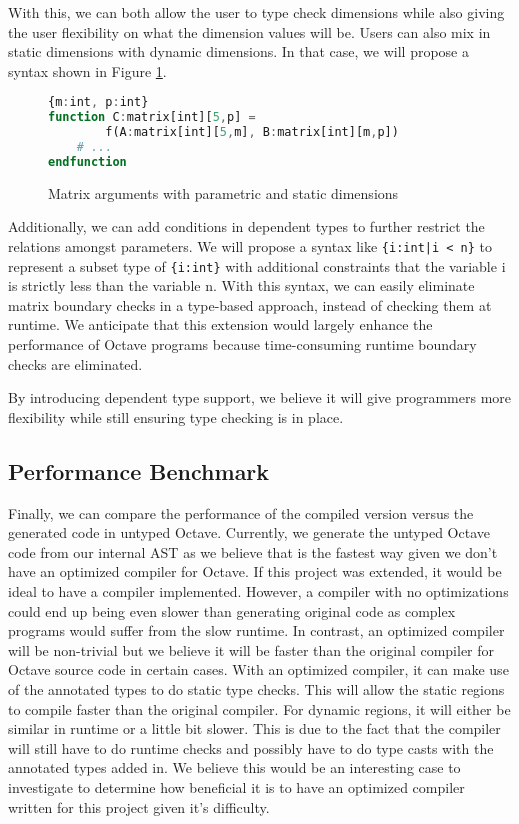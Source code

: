 With this, we can both allow the user to type check dimensions while also giving the user flexibility on what the dimension values will be. Users can also mix in static dimensions with dynamic dimensions. In that case, we will propose a syntax shown in Figure \ref{fig:variableAndStaticDimensions}.

\begin{figure}[h]
    \begin{lstlisting}[language=octave]
{m:int, p:int}
function C:matrix[int][5,p] = 
        f(A:matrix[int][5,m], B:matrix[int][m,p])
    # ...
endfunction
    \end{lstlisting}
    \caption[]{{Matrix arguments with parametric and static dimensions}}
    \label{fig:variableAndStaticDimensions}
\end{figure}

Additionally, we can add conditions in dependent types to further restrict the relations amongst parameters. We will propose a syntax like {\tt \{i:int|i < n\}} to represent a subset type of {\tt \{i:int\}} with additional constraints that the variable i is strictly less than the variable n. With this syntax, we can easily eliminate matrix boundary checks in a type-based approach, instead of checking them at runtime. We anticipate that this extension would largely enhance the performance of Octave programs because time-consuming runtime boundary checks are eliminated.

By introducing dependent type support, we believe it will give programmers more flexibility while still ensuring type checking is in place. 

\subsection{Performance Benchmark}
Finally, we can compare the performance of the compiled version versus the generated code in untyped Octave. Currently, we generate the untyped Octave code from our internal AST as we believe that is the fastest way given we don't have an optimized compiler for Octave. If this project was extended, it would be ideal to have a compiler implemented. However, a compiler with no optimizations could end up being even slower than generating original code as complex programs would suffer from the slow runtime. In contrast, an optimized compiler will be non-trivial but we believe it will be faster than the original compiler for Octave source code in certain cases. With an optimized compiler, it can make use of the annotated types to do static type checks. This will allow the static regions to compile faster than the original compiler. For dynamic regions, it will either be similar in runtime or a little bit slower. This is due to the fact that the compiler will still have to do runtime checks and possibly have to do type casts with the annotated types added in. We believe this would be an interesting case to investigate to determine how beneficial it is to have an optimized compiler written for this project given it's difficulty. 

